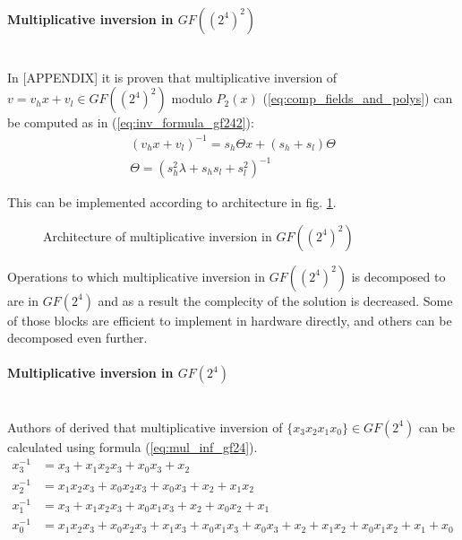 \paragraph{Multiplicative inversion in $GF((2^4)^2)$}\mbox{}\\
In \cite{vlsi}[APPENDIX] it is proven that multiplicative inversion of $v = v_hx + v_l \in GF((2^4)^2)$ modulo $P_2(x)$ (\ref{eq:comp_fields_and_polys}) can be computed as in (\ref{eq:inv_formula_gf242}):
\begin{equation}
\begin{gathered}
\label{eq:inv_formula_gf242}
(v_hx + v_l)^{-1} = s_h \Theta x + (s_h + s_l) \Theta\\
\Theta = (s_h^2 \lambda + s_hs_l + s_l^2)^{-1}
\end{gathered}
\end{equation}

This can be implemented according to architecture in fig. \ref{fig:mul_inv_gf242}.

\begin{figure}
\label{fig:mul_inv_gf242}
\missingfigure[figwidth=6cm]{}
\caption{Architecture of multiplicative inversion in $GF((2^4)^2)$}
\end{figure}

Operations to which multiplicative inversion in $GF((2^4)^2)$ is decomposed to are in $GF(2^4)$ and as a result the complecity of the solution is decreased. Some of those blocks are efficient to implement in hardware directly, and others can be decomposed even further.

\paragraph{Multiplicative inversion in $GF(2^4)$}\mbox{}\\
Authors of \cite{vlsi} derived that multiplicative inversion of $\{x_3x_2x_1x_0\} \in GF(2^4)$ can be calculated using formula (\ref{eq:mul_inf_gf24}).
\begin{equation}
\label{eq:mul_inf_gf24}
\begin{aligned}
x_3^{-1} &= x_3 + x_1x_2x_3 + x_0x_3 + x_2\\
x_2^{-1} &= x_1x_2x_3 + x_0x_2x_3 + x_0x_3 + x_2 + x_1x_2\\
x_1^{-1} &= x_3 + x_1x_2x_3 + x_0x_1x_3 + x_2 + x_0x_2 + x_1\\
x_0^{-1} &= x_1x_2x_3 + x_0x_2x_3 + x_1x_3 + x_0x_1x_3 + x_0x_3 + x_2 + x_1x_2 + x_0x_1x_2 + x_1 + x_0
\end{aligned}
\end{equation}


